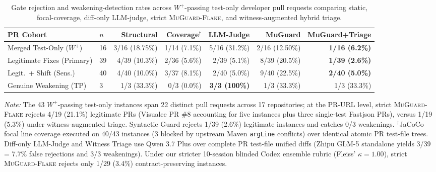\begin{table}[t]
\centering
\scriptsize
\setlength{\tabcolsep}{2.4pt}
\caption{Gate rejection and weakening-detection rates across $W^+$-passing test-only developer pull requests comparing static, focal-coverage, diff-only LLM-judge, strict \textsc{MuGuard-Flake}, and witness-augmented hybrid triage.}
\label{tab:pr_adjudication}
\begin{tabular}{llrrrrr}
\toprule
PR Cohort & $n$ & Structural & Coverage$^{\dagger}$ & LLM-Judge & MuGuard & MuGuard+Triage \\
\midrule
Merged Test-Only ($W^+$) & 16 & 3/16 (18.75\%) & 1/14 (7.1\%) & 5/16 (31.2\%) & 2/16 (12.50\%) & \textbf{1/16 (6.2\%)} \\
Legitimate Fixes (Primary) & 39 & 4/39 (10.3\%) & 2/36 (5.6\%) & 2/39 (5.1\%) & 8/39 (20.5\%) & \textbf{1/39 (2.6\%)} \\
Legit.\ + Shift (Sens.) & 40 & 4/40 (10.0\%) & 3/37 (8.1\%) & 2/40 (5.0\%) & 9/40 (22.5\%) & \textbf{2/40 (5.0\%)} \\
\midrule
Genuine Weakening (TP) & 3 & 1/3 (33.3\%) & 0/3 (0.0\%) & \textbf{3/3 (100\%)} & 1/3 (33.3\%) & 1/3 (33.3\%) \\
\bottomrule
\end{tabular}
\par\smallskip\parbox{0.97\textwidth}{\scriptsize\textit{Note:} The 43 $W^+$-passing test-only instances span 22 distinct pull requests across 17 repositories; at the PR-URL level, strict \textsc{MuGuard-Flake} rejects 4/19 (21.1\%) legitimate PRs (Visualee PR \#8 accounting for five instances plus three single-test Fastjson PRs), versus 1/19 (5.3\%) under witness-augmented triage. Syntactic Guard rejects 1/39 (2.6\%) legitimate instances and catches 0/3 weakenings. $^{\dagger}$JaCoCo focal line coverage executed on 40/43 instances (3 blocked by upstream Maven \texttt{argLine} conflicts) over identical atomic PR test-file trees. Diff-only LLM-Judge and Witness Triage use Qwen 3.7 Plus over complete PR test-file unified diffs (Zhipu GLM-5 standalone yields 3/39 = 7.7\% false rejections and 3/3 weakenings). Under our stricter 10-session blinded Codex ensemble rubric (Fleiss' $\kappa=1.00$), strict \textsc{MuGuard-Flake} rejects only 1/29 (3.4\%) contract-preserving instances.}
\end{table}
